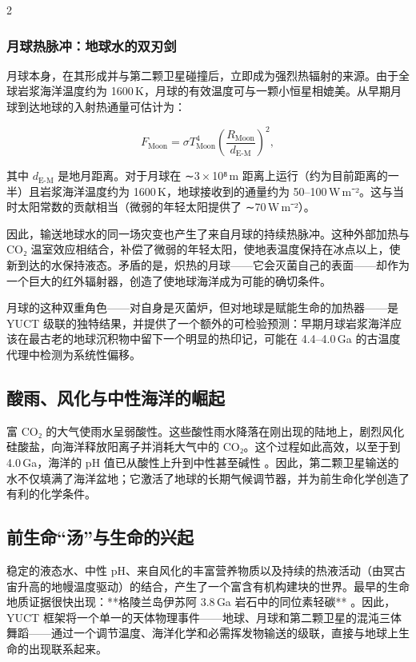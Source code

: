 \documentclass[11pt,a4paper]{article}
\begin{document}
\begin{multicols}{2}
		\subsubsection{月球热脉冲：地球水的双刃剑}
		
		月球本身，在其形成并与第二颗卫星碰撞后，立即成为强烈热辐射的来源。由于全球岩浆海洋温度约为 1600 K，月球的有效温度可与一颗小恒星相媲美。从早期月球到达地球的入射热通量可估计为：
		
		\[
		F_{\text{Moon}} = \sigma T_{\text{Moon}}^{4} \left( \frac{R_{\text{Moon}}}{d_{\text{E-M}}} \right)^{2},
		\]
		
		其中 \(d_{\text{E-M}}\) 是地月距离。对于月球在 ∼3 × 10⁸ m 距离上运行（约为目前距离的一半）且岩浆海洋温度约为 1600 K，地球接收到的通量约为 50–100 W m⁻²。这与当时太阳常数的贡献相当（微弱的年轻太阳提供了 ∼70 W m⁻²）。
		
		因此，输送地球水的同一场灾变也产生了来自月球的持续热脉冲。这种外部加热与 CO₂ 温室效应相结合，补偿了微弱的年轻太阳，使地表温度保持在冰点以上，使新到达的水保持液态。矛盾的是，炽热的月球——它会灭菌自己的表面——却作为一个巨大的红外辐射器，创造了使地球海洋成为可能的确切条件。
		
		月球的这种双重角色——对自身是灭菌炉，但对地球是赋能生命的加热器——是 YUCT 级联的独特结果，并提供了一个额外的可检验预测：早期月球岩浆海洋应该在最古老的地球沉积物中留下一个明显的热印记，可能在 4.4–4.0 Ga 的古温度代理中检测为系统性偏移。
		
		\subsection{酸雨、风化与中性海洋的崛起}
		
		富 CO₂ 的大气使雨水呈弱酸性。这些酸性雨水降落在刚出现的陆地上，剧烈风化硅酸盐，向海洋释放阳离子并消耗大气中的 CO₂。这个过程如此高效，以至于到 4.0 Ga，海洋的 pH 值已从酸性上升到中性甚至碱性 \cite{KrissansenTotton2019}。因此，第二颗卫星输送的水不仅填满了海洋盆地；它激活了地球的长期气候调节器，并为前生命化学创造了有利的化学条件。
		
		\subsection{前生命“汤”与生命的兴起}
		
		稳定的液态水、中性 pH、来自风化的丰富营养物质以及持续的热液活动（由冥古宙升高的地幔温度驱动）的结合，产生了一个富含有机构建块的世界。最早的生命地质证据很快出现：**格陵兰岛伊苏阿 3.8 Ga 岩石中的同位素轻碳** \cite{Arndt2012}。因此，YUCT 框架将一个单一的天体物理事件——地球、月球和第二颗卫星的混沌三体舞蹈——通过一个调节温度、海洋化学和必需挥发物输送的级联，直接与地球上生命的出现联系起来。
		

\end{multicols}
\end{document}
